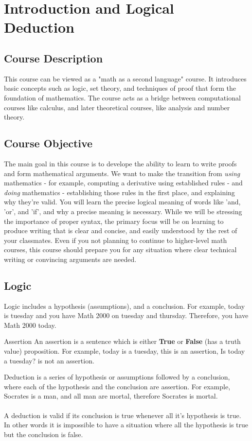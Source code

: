 \documentclass[../MATH-2000-Notes.tex]{subfiles}
\begin{document}
\chapter{Introduction and Logical Deduction}
\section{Course Description}
This course can be viewed as a "math as a second language" course. It introduces basic concepts such as logic, set theory, and techniques of proof that form the foundation of mathematics. The course acts as a bridge between computational courses like calculus, and later theoretical courses, like analysis and number theory.
\section{Course Objective}
The main goal in this course is to develope the ability to learn to write proofs and form mathematical arguments. We want to make the transition from \textit{using} mathematics - for example, computing a derivative using established rules - and \textit{doing} mathematics - establishing those rules in the first place, and explaining why they're valid. You will learn the precise logical meaning of words like 'and, 'or', and 'if', and why a precise meaning is necessary. While we will be stressing the importance of proper syntax, the primary focus will be on learning to produce writing that is clear and concise, and easily understood by the rest of your classmates. Even if you not planning to continue to higher-level math courses, this course should prepare you for any situation where clear technical writing or convincing arguments are needed.  
\section{Logic}
Logic includes a hypothesis (assumptions), and a conclusion. For example, today is tuesday and you have Math 2000 on tuesday and thursday. Therefore, you have Math 2000 today.

\begin{Definition}
    {Assertion}
    An assertion is a sentence which is either \textbf{True} or \textbf{False} (has a truth value) proposition. For example, today is a tuesday, this is an assertion, Is today a tuesday? is not an assertion.
\end{Definition}
\begin{Definition}
    {Deduction}
    is a series of hypothesis or assumptions followed by a conclusion, where each of the hypothesis and the conclusion are assertion. For example, Socrates is a man, and all man are mortal, therefore Socrates is mortal.
    \\~\\
    A deduction is valid if its conclusion is true whenever all it's hypothesis is true. In other words it is impossible to have a situation where all the hypothesis is true but the conclusion is false.
\end{Definition}
\end{document}
